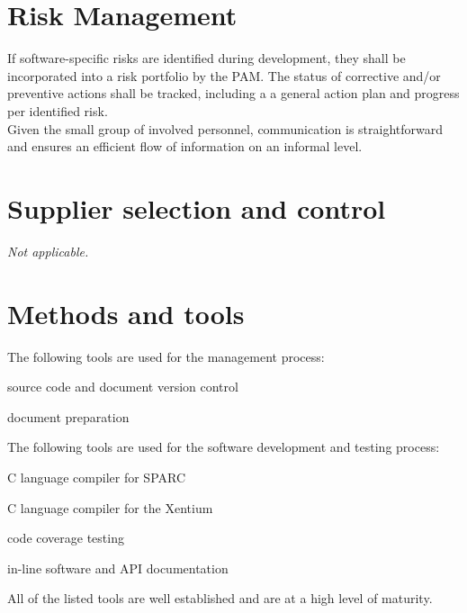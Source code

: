 \section{Risk Management}

If software-specific risks are identified during development, they shall be
incorporated into a risk portfolio by the \gls{PAM}. The status of corrective
and/or preventive actions shall be tracked, including a a general action plan
and progress per identified risk.\\

\noindent
Given the small group of involved personnel, communication is straightforward
and ensures an efficient flow of information on an informal level.


\section{Supplier selection and control}

\emph{Not applicable.}


\section{Methods and tools}

The following tools are used for the management process:

\begin{description}[labelwidth=4em,leftmargin=\parindent,labelindent=\parindent]
	\item[\textbf{git}]		source code and document version control
	\item[\textbf{TeX Live}]	document preparation
\end{description}


\noindent
The following tools are used for the software development and testing process:

\begin{description}[labelwidth=4em,leftmargin=\parindent,labelindent=\parindent]
	\item[\textbf{sparc-gcc}]	C language compiler for \gls{SPARC}
	\item[\textbf{xentium-clang}]	C language compiler for the \gls{Xentium}
	\item[\textbf{gcov}]		code coverage testing
	\item[\textbf{doxygen}]		in-line software and \gls{API} documentation
\end{description}

\noindent
All of the listed tools are well established and are at a high level of maturity.


